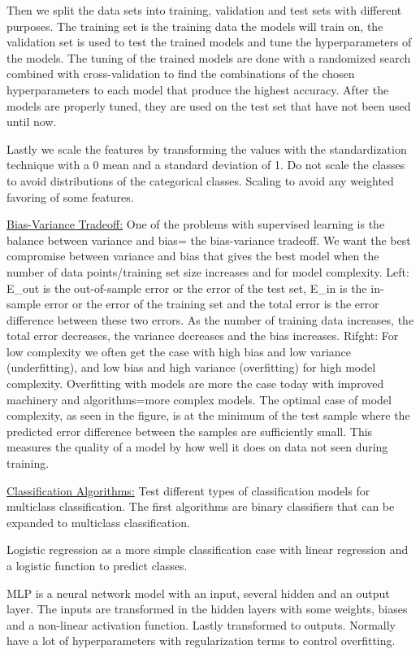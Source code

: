 \documentclass[a4paper, american, 12pt]{report}
\begin{document}
	Then we split the data sets into training, validation and test sets with different purposes. The training set is the training data the models will train on, the validation set is used to test the trained models and tune the hyperparameters of the models. The tuning of the trained models are done with a randomized search combined with cross-validation to find the combinations of the chosen hyperparameters to each model that produce the highest accuracy.
	After the models are properly tuned, they are used on the test set that have not been used until now.
	
	Lastly we scale the features by transforming the values with the standardization technique with a 0 mean and a standard deviation of 1. Do not scale the classes to avoid distributions of the categorical classes. Scaling to avoid any weighted favoring of some features.
	
	
	\underline{Bias-Variance Tradeoff:}
	One of the problems with supervised learning is the balance between variance and bias= the bias-variance tradeoff. We want the best compromise between variance and bias that gives the best model when the number of data points/training set size increases and for model complexity.
	Left: E\_out is the out-of-sample error or the error of the test set, E\_in is the in-sample error or the error of the training set and the total error is the error difference between these two errors. As the number of training data increases, the total error decreases, the variance decreases and the bias increases. 
	Rifght: For low complexity we often get the case with high bias and low variance (underfitting), and low bias and high variance (overfitting) for high model complexity. Overfitting with models are more the case today with improved machinery and algorithms=more complex models. The optimal case of model complexity, as seen in the figure, is at the minimum of the test sample where the predicted error difference between the samples are sufficiently small. This measures the quality of a model by how well it does on data not seen during training. 
	
	
	\underline{Classification Algorithms:}
	Test different types of classification models for multiclass classification. The first algorithms are binary classifiers that can be expanded to multiclass classification.
	
	Logistic regression as a more simple classification case with linear regression and a logistic function to predict classes.
	
	MLP is a neural network model with an input, several hidden and an output layer. The inputs are transformed in the hidden layers with some weights, biases and a non-linear activation function. Lastly transformed to outputs. Normally have a lot of hyperparameters with regularization terms to control overfitting.
	
\end{document}
